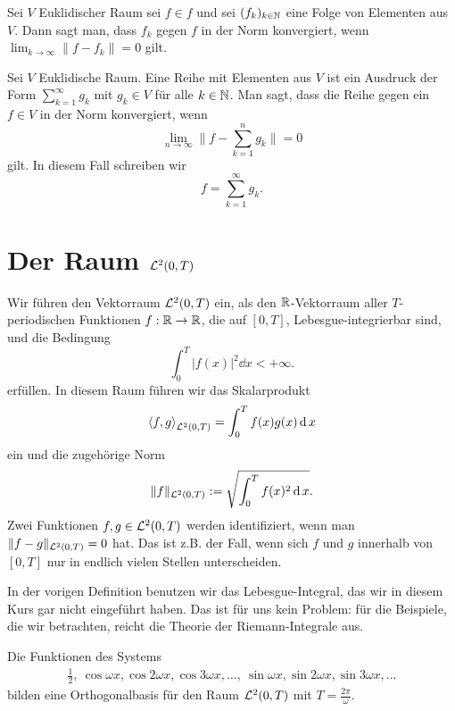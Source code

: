 \begin{defn}
	Sei $V$ Euklidischer Raum sei $f \in f$ und sei $(f_k)_{k \in \mathbb{N}}$ eine Folge von Elementen aus $V$. Dann sagt man, dass $f_k$ gegen $f$ in der Norm konvergiert, wenn $\lim_{k \to \infty} \|f - f_k\| =0$ gilt. 
\end{defn} 

\begin{defn}
	Sei $V$ Euklidische Raum. Eine Reihe mit Elementen aus $V$ ist ein Ausdruck der Form $\sum_{k=1}^\infty g_k$ mit $g_k \in V$ für alle $k \in \mathbb{N}$. Man sagt, dass die Reihe gegen ein $f \in V$ in der Norm konvergiert, wenn 
	\[
			\lim_{n \to \infty} \| f - \sum_{k=1}^n g_k\| = 0
	\]
	gilt. In diesem Fall schreiben wir 
	\[
			f = \sum_{k=1}^\infty g_k. 
	\]
\end{defn} 

\section{Der Raum $\mathcal{L}^2(0,T)$}

\begin{defn} 
	Wir führen den Vektorraum $\mathcal{L}^2(0,T)$ ein, als den $\mathbb{R}$-Vektorraum aller $T$-periodischen Funktionen $f : \mathbb{R} \to \mathbb{R}$, die auf $[0,T]$,  Lebesgue-integrierbar sind, und die Bedingung
	\[
		\int_0^T |f(x)|^2 \dd x < +\infty. 
	\]
	erfüllen. 
	In diesem Raum führen wir das Skalarprodukt 
	\[
		\left< f , g \right>_{\mathcal{L}^2(0,T)} = \int_0^T f(x) g(x) \operatorname{d} x 
	\]
	ein und die zugehörige Norm 
	\[
		\|f \|_{\mathcal{L}^2(0,T)} :=  \sqrt{ \int_0^T f(x)^2 \operatorname{d} x}.
	\]
	Zwei Funktionen $f, g \in \mathcal{L}^2(0,T)$ werden identifiziert, wenn man $\|f-g\|_{\mathcal{L}^2(0,T)}=0$ hat. Das ist z.B. der Fall, wenn sich $f$ und $g$ innerhalb von $[0,T]$ nur in endlich vielen Stellen unterscheiden. 
\end{defn} 

\begin{bem}
	In der vorigen Definition benutzen wir das Lebesgue-Integral, das wir in diesem Kurs gar nicht eingeführt haben. Das ist für uns kein Problem: für die Beispiele, die wir betrachten, reicht die Theorie der Riemann-Integrale aus.
\end{bem} 


\begin{thm}
	Die Funktionen des Systems
	\begin{align}
		\label{fourier:system}
		 \frac{1}{2}, \ \cos  \omega x, \cos 2 \omega x, \cos 3\omega x, \ldots , \ \sin  \omega x, \sin 2 \omega x, \sin 3 \omega x, \ldots 
	\end{align}
	bilden eine Orthogonalbasis für den Raum $\mathcal{L}^2(0,T)$ mit $T = \frac{2 \pi}{\omega}$. 
\end{thm} 	

